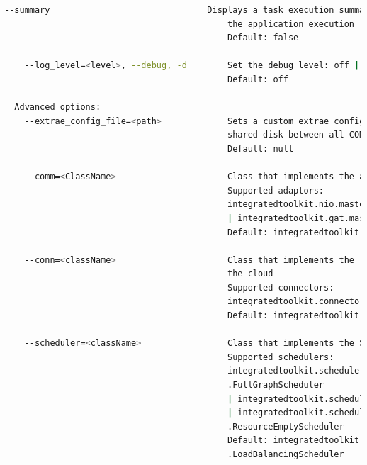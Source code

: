 \begin{lstlisting}[language=bash]
    --summary                               Displays a task execution summary at the end of 
                                            the application execution
                                            Default: false
                                            
    --log_level=<level>, --debug, -d        Set the debug level: off | info | debug
                                            Default: off

  Advanced options:
    --extrae_config_file=<path>             Sets a custom extrae config file. Must be in a 
                                            shared disk between all COMPSs workers.
                                            Default: null
                                            
    --comm=<ClassName>                      Class that implements the adaptor for communications
                                            Supported adaptors: 
                                            integratedtoolkit.nio.master.NIOAdaptor 
                                            | integratedtoolkit.gat.master.GATAdaptor
                                            Default: integratedtoolkit.nio.master.NIOAdaptor
                                            
    --conn=<className>                      Class that implements the runtime connector for 
                                            the cloud
                                            Supported connectors: 
                                            integratedtoolkit.connectors.DefaultSSHConnector
                                            Default: integratedtoolkit.connectors.DefaultSSHConnector
                                            
    --scheduler=<className>                 Class that implements the Scheduler for COMPSs
                                            Supported schedulers: 
                                            integratedtoolkit.scheduler.fullGraphScheduler
                                            .FullGraphScheduler
                                            | integratedtoolkit.scheduler.fifoScheduler.FIFOScheduler
                                            | integratedtoolkit.scheduler.resourceEmptyScheduler
                                            .ResourceEmptyScheduler
                                            Default: integratedtoolkit.scheduler.loadBalancingScheduler
                                            .LoadBalancingScheduler
                                            

\end{lstlisting}
